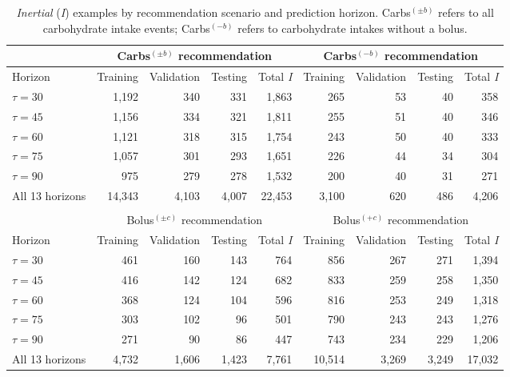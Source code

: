 \begin{table}[ht]\setlength{\tabcolsep}{4pt}
\begin{center}
\caption{{\it Inertial} ({\it I}) examples by recommendation scenario and prediction horizon. Carbs$^{(\pm b)}$ refers to all carbohydrate intake events; Carbs$^{(-b)}$ refers to carbohydrate intakes without a bolus.}
\label{tab:c1_examples}
\small
\begin{tabular}{|l|rrrr|rrrr|}
    \cline{2-9}
    \multicolumn{1}{c}{}& \multicolumn{4}{|c|}{Carbs$^{(\pm b)}$ recommendation} & \multicolumn{4}{c|}{Carbs$^{(-b)}$ recommendation}\\
    \hline
    Horizon & Training & Validation & Testing & Total {\it I} & Training & Validation & Testing & Total {\it I}\\
    \hline
    $\tau=30$ & 1,192 & 340 & 331 & 1,863 & 265 & 53 & 40 & 358\\
    $\tau=45$ & 1,156 & 334 & 321 & 1,811 & 255 & 51 & 40 & 346\\ 
    $\tau=60$ & 1,121 & 318 & 315 & 1,754 & 243 & 50 & 40 & 333\\
    $\tau=75$ & 1,057 & 301 & 293 & 1,651 & 226 & 44 & 34 & 304\\ 
    $\tau=90$ & 975 & 279 & 278 & 1,532 & 200 & 40 & 31 & 271\\
    All 13 horizons & 14,343 & 4,103 & 4,007 & 22,453 & 3,100 & 620 & 486 & 4,206\\
    \hline
	\multicolumn{5}{c}{}\\[-1.5ex]
	\cline{2-9}
    \multicolumn{1}{c}{} & \multicolumn{4}{|c|}{Bolus$^{(\pm c)}$ recommendation} & \multicolumn{4}{c|}{Bolus$^{(+ c)}$ recommendation}\\
    \hline
    Horizon & Training & Validation & Testing & Total {\it I} & Training & Validation & Testing & Total {\it I}\\
    \hline
    $\tau=30$ & 461 & 160 & 143 & 764 & 856 & 267 & 271 & 1,394\\
    $\tau=45$ & 416 & 142 & 124 & 682 & 833 & 259 & 258 & 1,350\\
    $\tau=60$ & 368 & 124 & 104 & 596 & 816 & 253 & 249 & 1,318\\
    $\tau=75$ & 303 & 102 & 96 & 501 & 790 & 243 & 243 & 1,276\\
    $\tau=90$ & 271 & 90 & 86 & 447 & 743 & 234 & 229 & 1,206\\
    All 13 horizons & 4,732 & 1,606 & 1,423 & 7,761 & 10,514 & 3,269 & 3,249 & 17,032\\

\end{tabular}
\end{center}
\end{table}
